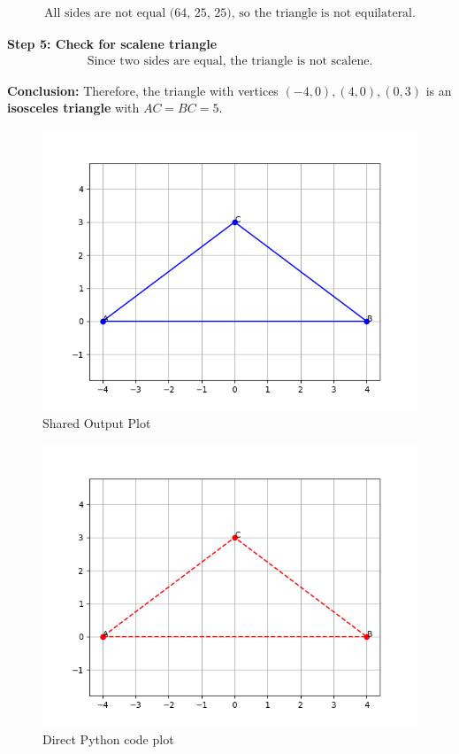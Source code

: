 \documentclass[journal]{IEEEtran}
\begin{document}
\begin{align*}
\text{All sides are not equal (64, 25, 25), so the triangle is not equilateral.}
\end{align*}


\textbf{Step 5: Check for scalene triangle}
\begin{align*}
\text{Since two sides are equal, the triangle is not scalene.}
\end{align*}


\textbf{Conclusion:} Therefore, the triangle with vertices $(-4,0), (4,0), (0,3)$ is an \textbf{isosceles triangle} with $AC = BC = 5$.

\begin{figure}[H]
    \centering
    \includegraphics[width=0.8\columnwidth]{figs/Figure_1.png}
    \caption{Shared Output Plot}
    \label{fig:fig1}
\end{figure}

\begin{figure}[H]
    \centering
    \includegraphics[width=0.8\columnwidth]{figs/Figure_2.png}
    \caption{Direct Python code plot}
    \label{fig:fig2}
\end{figure}
\end{document}
